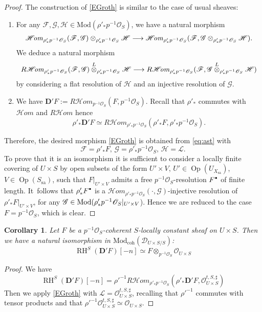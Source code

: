 \documentclass[english]{smfart}
\numberwithin{subsection}{section}
\def\shd{\mathcal{D}}\let\cD\shd
\def\shf{\mathcal{F}}\let\cF F
\def\shg{\mathcal{G}}\let\cG G
\def\shh{\mathcal{H}}
\def\shh{\mathcal{H}}
\def\shl{\mathcal{L}}
\def\sho{\mathcal{O}}\let\cO\sho
\newcommand{\bD}{\boldsymbol{D}}
\newcommand{\Rhom}{R\shhom}
\newcommand{\shhom}{\mathcal{H}\!\mathit{om}}\let\ho\shhom
\DeclareMathOperator{\RH}{RH}
\newcommand{\coh}{\mathrm{coh}}
\newcommand{\Mod}{\mathrm{Mod}}
\newcommand{\sa}{\mathrm{sa}}
\DeclareMathOperator{\Op}{Op}
\newcommand{\cbbullet}{{\raisebox{1pt}{$\sbullet$}}}
\newcommand{\sbullet}{{\scriptscriptstyle\bullet}}
\newcommand{\pOS}{p^{-1}\sho_S}
\numberwithin{equation}{section}
\theoremstyle{plain}
\newtheorem{corollary}[equation]{Corollary}
\theoremstyle{definition}
\def\to{\mathchoice{\longrightarrow}{\rightarrow}{\rightarrow}{\rightarrow}}
\begin{document}
\begin{proof}
The construction of \eqref{EGroth} is similar to the case of usual sheaves:
\begin{enumerate}
\item
For any $\shf,\shg,\shh\in\Mod(\rho'_*\pOS)$, we have a natural morphism
\[
\shhom_{\rho'_*\pOS}(\shf,\shg)\otimes_{\rho'_*\pOS}\shh\to \shhom_{\rho'_*\pOS}(\shf,\shg\otimes_{\rho'_*\pOS}\shh).
\]
We deduce a natural morphism
\begin{equation}\label{eq:ast}
\Rhom_{\rho'_*\pOS}(\shf,\shg)\overset{L}{\otimes}_{\rho'_*\pOS}\shh\to \Rhom_{\rho'_*\pOS}(\shf,\shg\overset{L}{\otimes}_{\rho'_*\pOS}\shh)
\end{equation}
by considering a flat resolution of $\shh$ and an injective resolution of $\shg$.

\item
We have $\bD'F:=\Rhom_{\pOS}(F, \pOS)$.
Recall that $\rho'_*$ commutes with $\shhom$ and $\Rhom$ hence $$\rho'_*\bD'F\simeq \Rhom_{\rho'_*\pOS}(\rho'_*F, \rho'_*\pOS).$$
\end{enumerate}
Therefore, the desired morphism \eqref{EGroth} is obtained from \eqref{eq:ast} with
\[
\shf=\rho'_*F,\, \shg=\rho'_*\pOS,\, \shh=\shl.
\]
To prove that it is an isomorphism it is sufficient to consider a locally finite covering of $U\times S$ by open subsets of the form $U'\times V$, $U'\in\Op(U_{X_{\sa}})$, $V\in \Op(S_{\sa})$, such that $F|_{U'\times V}$ admits a free $\pOS$-resolution $F^\cbbullet$ of finite length. It~follows that $\rho'_*F^\cbbullet$ is a $\shhom_{\rho'_*\pOS}(\cdot, \shg)$-injective resolution of $\rho'_*F|_{U'\times V}$, for any $\shg\in\nobreak\Mod(\rho'_*\pOS|_{U'\times V}$). Hence we are reduced to the case $F=\pOS$, which is clear.
\end{proof}

\begin{corollary}\label{C:RHDe}
Let $F$ be a $\pOS$-coherent $S$-locally constant sheaf on $U\times S$. Then we have a natural isomorphism in $\Mod_{\coh}(\shd_{U\times S/S})$:
\[
\RH^S(\bD'F)[-n]\simeq F\otimes_{\pOS}\sho_{U\times S}
\]
\end{corollary}

\begin{proof}
We have $$\RH^S(\bD'F)[-n]=\rho'^{-1}\Rhom_{\rho'_*\pOS}(\rho'_*\bD'F,\sho_{U\times S}^{t,S,\sharp})$$
Then we apply \eqref{EGroth} with $\shl=\sho_{U\times S}^{t,S,\sharp}$, recalling that $\rho'^{-1}$ commutes with tensor products and that $\rho'^{-1}\sho_{U\times S}^{t,S,\sharp}\simeq \sho_{U\times S}$.
\end{proof}
\end{document}
